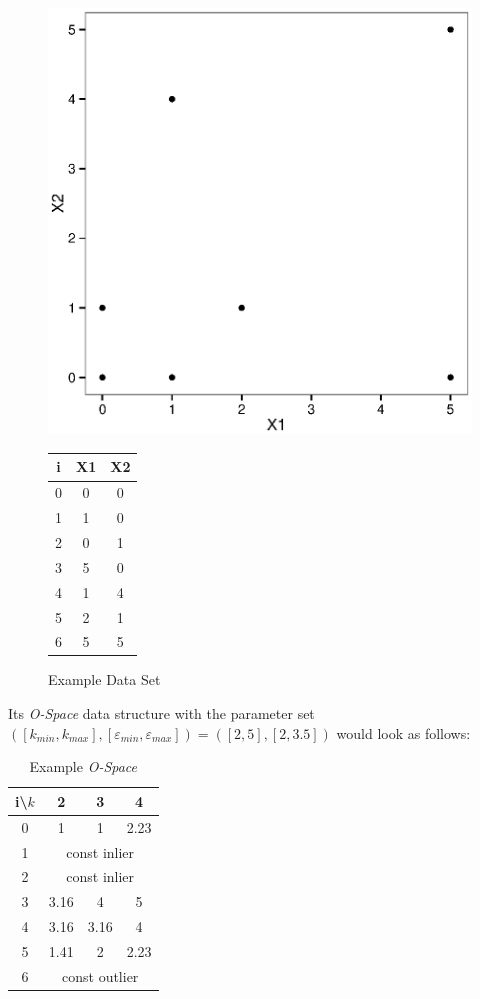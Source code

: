 \documentclass[runningheads]{llncs}
\begin{document}
\begin{figure}
\begin{minipage}[H]{.65\textwidth}
\centering
\includegraphics[width=.7\linewidth]{images/example_plot.eps}
\end{minipage}
\begin{minipage}[H]{.3\textwidth}
\centering
\begin{tabular}{ | c | c  c |}
\hline
i & X1 & X2 \\
\hline
0 & 0 & 0 \\
1 & 1 & 0 \\
2 & 0 & 1 \\
3 & 5 & 0 \\
4 & 1 & 4 \\
5 & 2 & 1 \\
6 & 5 & 5 \\
\hline
\end{tabular}
\end{minipage}
\caption{Example Data Set}
\end{figure}

Its \emph{O-Space} data structure with the parameter set $([k_{min},k_{max}],[\varepsilon_{min},\varepsilon_{max}])=([2,5],[2,3.5])$ would look as follows:

\begin{table}
\caption{Example \emph{O-Space}}
\centering
\begin{tabular} {| c | c | c | c |}
\hline
i\textbackslash$k$ & 2 & 3 & 4\\
\hline
0 & 1 & 1 & 2.23 \\
\hline
1 &\multicolumn{3}{|c|}{const inlier}\\
2 &\multicolumn{3}{|c|}{const inlier}\\
\hline
3 & 3.16 & 4 & 5 \\
4 & 3.16 & 3.16 & 4 \\
5 & 1.41 & 2 & 2.23\\
\hline
6 &\multicolumn{3}{|c|}{const outlier}\\
\hline
\end{tabular}
\end{table}
\end{document}
